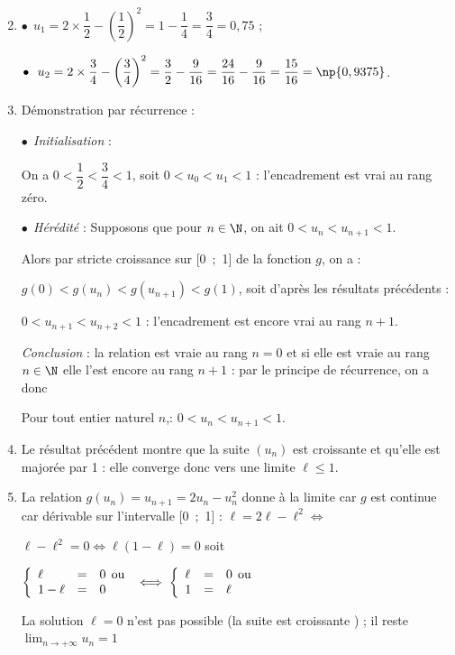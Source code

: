 \begin{enumerate}
\setcounter{enumi}{1}
\item %
$\bullet~~u_1 = 2 \times \dfrac{1}{2} - \left(\dfrac{1}{2}\right)^2 = 1 - \dfrac14 = \dfrac34 = 0,75$ ;

$\bullet~~u_2 = 2 \times \dfrac34 - \left(\dfrac34\right)^2 = \dfrac32 - \dfrac{9}{16} = \dfrac{24}{16} -  \dfrac{9}{16} = \dfrac{15}{16} = \np{0,9375}$.
\item %
Démonstration par récurrence :

$\bullet~~$\emph{Initialisation} :

On a $0 < \dfrac12 < \dfrac34 < 1$, soit $0 < u_0 < u_1 < 1$ : l'encadrement est vrai au rang zéro.

$\bullet~~$\emph{Hérédité} :
Supposons que pour $n \in \N$, on ait $0 < u_{n} < u_{n+1}< 1$.

Alors par stricte croissance sur [0~;~1] de la fonction $g$, on a :

$g(0) < g\left(u_n\right) < g\left(u_{n+1} \right) < g(1)$, soit d'après les résultats précédents :

$0 < u_{n+1} < u_{n+2} < 1$ : l'encadrement est encore vrai au rang $n + 1$.

\emph{Conclusion} : la relation est vraie au rang $n = 0$ et si elle est vraie au rang $n \in \N$ elle l'est encore au rang $n + 1$ : par le principe de récurrence, on a donc 

Pour tout entier naturel $n$,\:: $0 < u_{n} < u_{n+1} < 1$.
\item %
Le résultat précédent montre que la suite $\left(u_{n}\right)$ est croissante  et qu'elle est majorée par 1 : elle converge donc vers une limite $\ell \leqslant 1$.
\item %
La relation $g\left(u_n\right) = u_{n+1} = 2u_n - u_n^2$ donne à la limite car $g$ est continue car dérivable sur l'intervalle [0~;~1] : $\ell = 2\ell - \ell^2 \iff $

$\ell - \ell^2 = 0 \iff \ell (1 - \ell) = 0$ soit 

$\left\{\begin{array}{l c l}
\ell&=&0 \:\:\text{ou}\\
1 - \ell&=&0
\end{array}\right. \iff \left\{\begin{array}{l c l}
\ell&=&0 \:\:\text{ou}\\
1  &=&\ell
\end{array}\right.$

La solution $\ell = 0 $ n'est pas possible (la suite est croissante ) ; il reste $\displaystyle\lim_{n \to + \infty} u_n = 1$
\end{enumerate}

